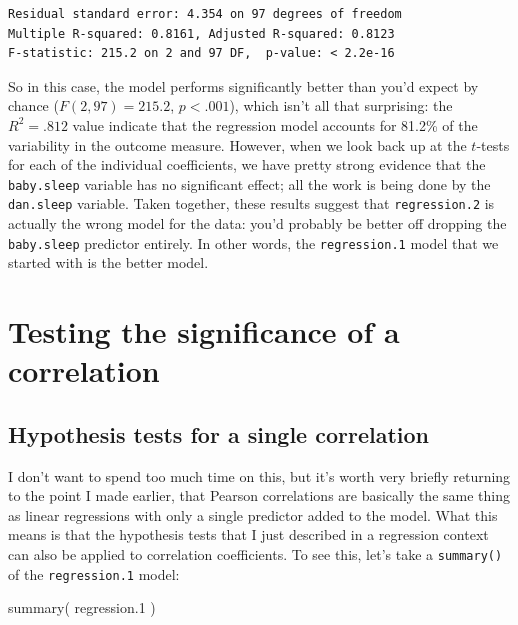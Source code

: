 \documentclass[
]{book}
\newenvironment{Shaded}{\begin{snugshade}}{\end{snugshade}}
\newcommand{\FloatTok}[1]{\textcolor[rgb]{0.00,0.00,0.81}{#1}}
\newcommand{\FunctionTok}[1]{\textcolor[rgb]{0.00,0.00,0.00}{#1}}
\newcommand{\NormalTok}[1]{#1}
\begin{document}
\begin{verbatim}
Residual standard error: 4.354 on 97 degrees of freedom
Multiple R-squared: 0.8161, Adjusted R-squared: 0.8123 
F-statistic: 215.2 on 2 and 97 DF,  p-value: < 2.2e-16 
\end{verbatim}

So in this case, the model performs significantly better than you'd expect by chance (\(F(2,97) = 215.2\), \(p<.001\)), which isn't all that surprising: the \(R^2 = .812\) value indicate that the regression model accounts for 81.2\% of the variability in the outcome measure. However, when we look back up at the \(t\)-tests for each of the individual coefficients, we have pretty strong evidence that the \texttt{baby.sleep} variable has no significant effect; all the work is being done by the \texttt{dan.sleep} variable. Taken together, these results suggest that \texttt{regression.2} is actually the wrong model for the data: you'd probably be better off dropping the \texttt{baby.sleep} predictor entirely. In other words, the \texttt{regression.1} model that we started with is the better model.

\hypertarget{corrhyp}{%
\section{Testing the significance of a correlation}\label{corrhyp}}

\hypertarget{hypothesis-tests-for-a-single-correlation}{%
\subsection{Hypothesis tests for a single correlation}\label{hypothesis-tests-for-a-single-correlation}}

I don't want to spend too much time on this, but it's worth very briefly returning to the point I made earlier, that Pearson correlations are basically the same thing as linear regressions with only a single predictor added to the model. What this means is that the hypothesis tests that I just described in a regression context can also be applied to correlation coefficients. To see this, let's take a \texttt{summary()} of the \texttt{regression.1} model:

\begin{Shaded}
\begin{Highlighting}[]
\FunctionTok{summary}\NormalTok{( regression}\FloatTok{.1}\NormalTok{ )}
\end{Highlighting}
\end{Shaded}
\end{document}

